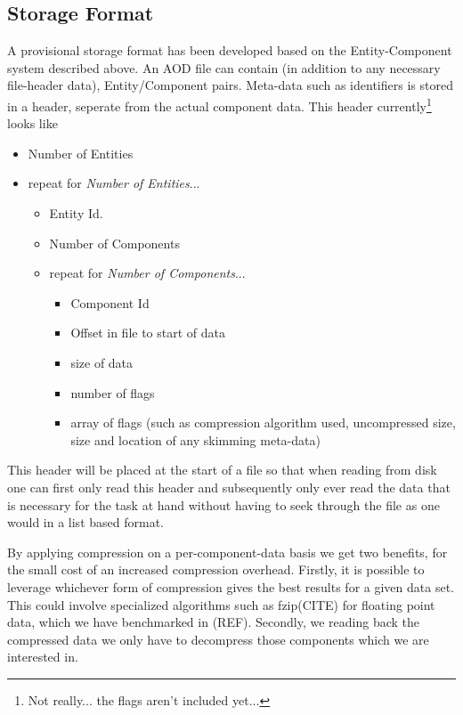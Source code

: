 \documentclass[a4paper]{report}
\begin{document}
\subsection{Storage Format}
A provisional storage format has been developed based on the Entity-Component system described above. An AOD file can contain (in addition to any necessary file-header data),
Entity/Component pairs. Meta-data such as identifiers is stored in a header, seperate from the actual component data. This header currently\footnote{Not really... the flags
aren't included yet...} looks like
\begin{itemize}
  \item Number of Entities
  \item repeat for {\em Number of Entities}...
  \begin{itemize}
    \item Entity Id.
    \item Number of Components
    \item repeat for {\em Number of Components}...
    \begin{itemize}
      \item Component Id
      \item Offset in file to start of data
      \item size of data
      \item number of flags
      \item array of flags (such as compression algorithm used, uncompressed size, size and location of any skimming meta-data)
  \end{itemize}
\end{itemize}
\end{itemize}

\par This header will be placed at the start of a file so that when reading from disk one can first only read this header and subsequently only ever read the data that is
necessary for the task at hand without having to seek through the file as one would in a list based format.

\par By applying compression on a per-component-data basis we get two benefits, for the small cost of an increased compression overhead. Firstly, it is possible to leverage whichever form of compression gives the best results for
a given data set. This could involve specialized algorithms such as fzip(CITE) for floating point data, which we have benchmarked in (REF). Secondly, we reading back the compressed data
we only have to decompress those components which we are interested in.
\end{document}
